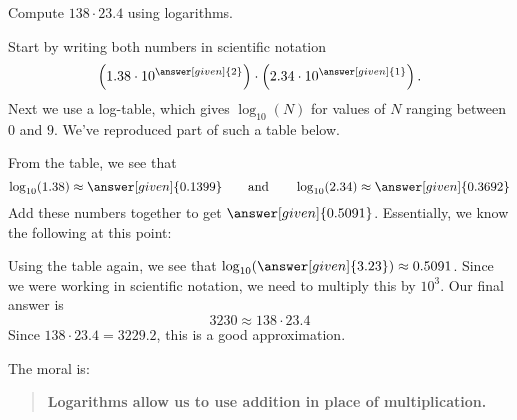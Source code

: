 \documentclass{ximera}
\begin{document}
	\begin{example}
		Compute $138\cdot 23.4$ using logarithms.
		\begin{explanation}
			Start by writing both numbers in scientific notation
			\[
			\left(1.38\cdot 10^{\answer[given]{2}}\right)\cdot \left(2.34 \cdot 10^{\answer[given]{1}}\right).
			\]
			Next we use a log-table, which gives $\log_{10}(N)$ for values of
			$N$ ranging between $0$ and $9$. We've reproduced part of such a
			table below.
			\begin{image}
			\end{image}
			From the table, we see that 
			\[
			\log_{10}(1.38) \approx \answer[given]{0.1399}\qquad\text{and}\qquad \log_{10}(2.34)\approx \answer[given]{0.3692}
			\]
			Add these numbers together to get $\answer[given]{0.5091}$.
			Essentially, we know the following at this point:
			\begin{center}
			\end{center}
			Using the table again, we see that
			$\log_{10}(\answer[given]{3.23})\approx 0.5091$. Since we were
			working in scientific notation, we need to multiply this by
			$10^3$. Our final answer is
			\[
			3230 \approx 138\cdot 23.4
			\]
			Since $138\cdot 23.4 = 3229.2$, this is a good approximation.
		\end{explanation}
	\end{example}
	The moral is:
	\begin{quote}
		\textbf{Logarithms allow us to use addition in place of multiplication.}
	\end{quote}
	
\end{document}
